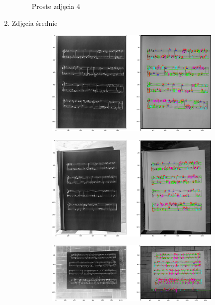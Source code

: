 \documentclass[12pt]{article}
\begin{document}
\begin{enumerate}
\begin{figure}[h!]
\begin{subfigure}[b]{0.48\linewidth}
				\end{subfigure}
				\label{fig:nuuty3}
				\caption{Proste zdjęcia 4}
			\end{figure}
			\clearpage
			\item{Zdjęcia średnie}
			\begin{figure}[h!]
				\centering
				\begin{subfigure}[b]{0.48\linewidth}
					\includegraphics[width=\linewidth]{Medium/Zdj0.png}
				\end{subfigure}
				\begin{subfigure}[b]{0.48\linewidth}
					\includegraphics[width=\linewidth]{Medium/Zdj1.png}
				\end{subfigure}
				\begin{subfigure}[b]{0.48\linewidth}
					\includegraphics[width=\linewidth]{Medium/Zdj2.png}

\end{subfigure}
\end{figure}
\end{enumerate}
\end{document}

